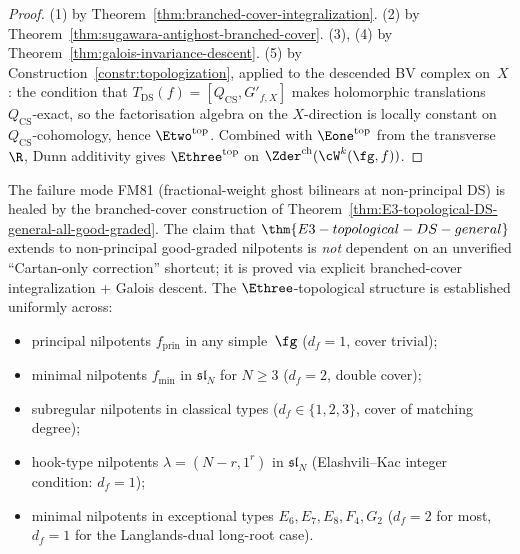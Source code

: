\begin{proof}
(1) by Theorem~\ref{thm:branched-cover-integralization}.
(2) by Theorem~\ref{thm:sugawara-antighost-branched-cover}.
(3), (4) by Theorem~\ref{thm:galois-invariance-descent}.
(5) by Construction~\ref{constr:topologization}, applied to the
descended BV complex on~$X$: the condition that
$T_{\mathrm{DS}}(f) = [Q_{\mathrm{CS}}, G'_{f, X}]$ makes
holomorphic translations $Q_{\mathrm{CS}}$-exact, so the
factorisation algebra on the $X$-direction is locally constant on
$Q_{\mathrm{CS}}$-cohomology, hence $\Etwo^{\mathrm{top}}$. Combined
with $\Eone^{\mathrm{top}}$ from the transverse~$\R$, Dunn
additivity gives $\Ethree^{\mathrm{top}}$ on
$\Zder^{\mathrm{ch}}(\cW^{k}(\fg, f))$.
\end{proof}

\begin{corollary}
\label{cor:fm81-healed-non-principal}
\ClaimStatusProvedHere{}
The failure mode FM81 \textup{(}fractional-weight ghost bilinears
at non-principal DS\textup{)} is healed by the branched-cover
construction of
Theorem~\ref{thm:E3-topological-DS-general-all-good-graded}. The
claim that $\thm{E3-topological-DS-general}$ extends to non-principal
good-graded nilpotents is
\emph{not} dependent on an unverified ``Cartan-only correction'' shortcut; it is
proved via explicit branched-cover integralization + Galois descent.
The $\Ethree$-topological structure is established uniformly across:
\begin{itemize}[nosep]
\item principal nilpotents $f_{\mathrm{prin}}$ in any simple~$\fg$
      \textup{(}$d_{f} = 1$, cover trivial\textup{)};
\item minimal nilpotents $f_{\min}$ in $\mathfrak{sl}_{N}$ for
      $N \ge 3$ \textup{(}$d_{f} = 2$, double cover\textup{)};
\item subregular nilpotents in classical types
      \textup{(}$d_{f} \in \{1, 2, 3\}$, cover of matching
      degree\textup{)};
\item hook-type nilpotents $\lambda = (N{-}r, 1^{r})$ in
      $\mathfrak{sl}_{N}$ \textup{(}Elashvili--Kac integer
      condition: $d_{f} = 1$\textup{)};
\item minimal nilpotents in exceptional types $E_{6}, E_{7}, E_{8},
      F_{4}, G_{2}$ \textup{(}$d_{f} = 2$ for most, $d_{f} = 1$ for
      the Langlands-dual long-root case\textup{)}.
\end{itemize}
\end{corollary}

